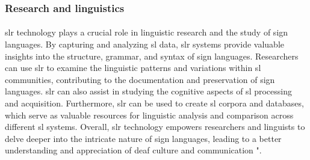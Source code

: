 \subsubsection{Research and linguistics}
\paragraph{}
\ac{slr} technology plays a crucial role in linguistic research and the study of sign languages. By capturing and analyzing \ac{sl} data, \ac{slr} systems provide valuable insights into the structure, grammar, and syntax of sign languages. Researchers can use \ac{slr} to examine the linguistic patterns and variations within \ac{sl} communities, contributing to the documentation and preservation of sign languages. \ac{slr} can also assist in studying the cognitive aspects of \ac{sl} processing and acquisition. Furthermore, \ac{slr} can be used to create \ac{sl} corpora and databases, which serve as valuable resources for linguistic analysis and comparison across different \ac{sl} systems. Overall, \ac{slr} technology empowers researchers and linguists to delve deeper into the intricate nature of sign languages, leading to a better understanding and appreciation of deaf culture and communication "\cite{jepsen2015sign, semino2016routledge}.